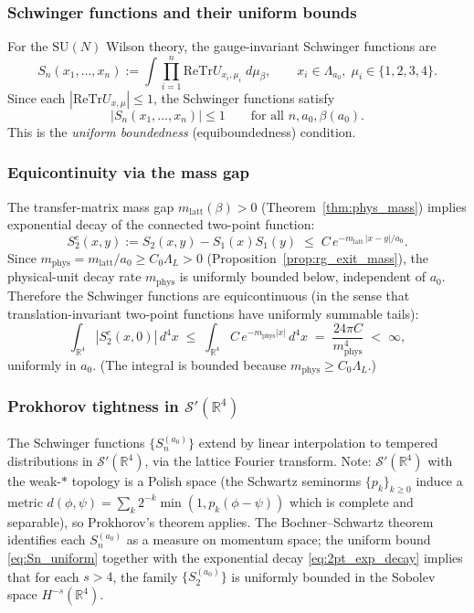 \documentclass[11pt,a4paper]{amsart}
\theoremstyle{definition}
\newcommand{\SU}{\mathrm{SU}}
\newcommand{\R}{\mathbb{R}}
\newcommand{\re}{\mathrm{Re}}
\newcommand{\Tr}{\mathrm{Tr}}
\begin{document}
\subsubsection*{Schwinger functions and their uniform bounds}

For the $\SU(N)$ Wilson theory, the gauge-invariant Schwinger functions are
\[
  S_n(x_1,\ldots,x_n)
  := \int \prod_{i=1}^n \re\Tr U_{x_i,\mu_i}\; d\mu_\beta,
  \qquad x_i \in \Lambda_{a_0},\; \mu_i\in\{1,2,3,4\}.
\]
Since each $|\re\Tr U_{x,\mu}| \le 1$, the Schwinger functions satisfy
\begin{equation}
\label{eq:Sn_uniform}
  |S_n(x_1,\ldots,x_n)| \le 1 \qquad \text{for all } n, a_0, \beta(a_0).
\end{equation}
This is the \emph{uniform boundedness} (equiboundedness) condition.

\subsubsection*{Equicontinuity via the mass gap}

The transfer-matrix mass gap $m_{\mathrm{latt}}(\beta) > 0$ (Theorem~\ref{thm:phys_mass})
implies exponential decay of the connected two-point function:
\begin{equation}
\label{eq:2pt_exp_decay}
  S_2^c(x,y) := S_2(x,y) - S_1(x)S_1(y)
  \;\le\; C\,e^{-m_{\mathrm{latt}}\,|x-y|/a_0}.
\end{equation}
Since $m_{\mathrm{phys}} = m_{\mathrm{latt}}/a_0 \ge C_0\Lambda_L > 0$
(Proposition~\ref{prop:rg_exit_mass}), the physical-unit decay rate
$m_{\mathrm{phys}}$ is uniformly bounded below, independent of $a_0$.
Therefore the Schwinger functions are equicontinuous (in the sense that
translation-invariant two-point functions have uniformly summable tails):
\[
  \int_{\R^4} |S_2^c(x,0)|\,d^4x
  \;\le\; \int_{\R^4} C\,e^{-m_{\mathrm{phys}}|x|}\,d^4x
  \;=\; \frac{24\pi C}{m_{\mathrm{phys}}^4}
  \;<\; \infty,
\]
uniformly in $a_0$.  (The integral is bounded because $m_{\mathrm{phys}} \ge C_0\Lambda_L$.)

\subsubsection*{Prokhorov tightness in $\mathcal{S}'(\R^4)$}

The Schwinger functions $\{S_n^{(a_0)}\}$ extend by linear interpolation to
tempered distributions in $\mathcal{S}'(\R^4)$, via the lattice Fourier transform.
Note: $\mathcal{S}'(\R^4)$ with the weak-$*$ topology is a Polish space
(the Schwartz seminorms $\{p_k\}_{k\ge 0}$ induce a metric
$d(\phi,\psi) = \sum_k 2^{-k}\min(1, p_k(\phi-\psi))$ which is complete
and separable), so Prokhorov's theorem applies.
The Bochner--Schwartz theorem identifies each $S_n^{(a_0)}$ as a measure
on momentum space; the uniform bound \eqref{eq:Sn_uniform} together with the
exponential decay \eqref{eq:2pt_exp_decay} implies that for each $s > 4$,
the family $\{S_2^{(a_0)}\}$ is uniformly bounded in the Sobolev space
$H^{-s}(\R^4)$.
\end{document}
